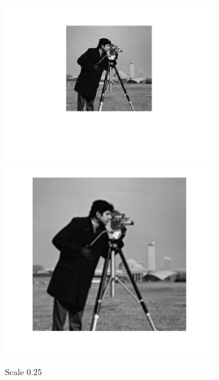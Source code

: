 \documentclass{article}
\begin{document}
\begin{figure}[h!]
\begin{subfigure}[t]{0.3\textwidth}
		\centering
		\includegraphics[width=\linewidth]{./output_images/DOWN_anti-alias_cubic_scale_0_250000.png}
		\includegraphics[width=\linewidth]{./output_images/UP_anti-alias_cubic_scale_0_250000.png}
		\caption{Scale 0.25}
	\end{subfigure}
	~
	\begin{subfigure}[t]{0.3\textwidth}
		\centering

\end{subfigure}
\end{figure}
\end{document}
